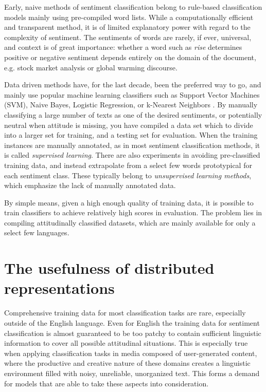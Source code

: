 Early, naive methods of sentiment classification belong to rule-based classification models mainly using pre-compiled word lists. While a computationally efficient and transparent method, it is of limited explanatory power with regard to the complexity of sentiment. The sentiments of words are rarely, if ever, universal, and context is of great importance: whether a word such as \emph{rise} determines positive or negative sentiment depends entirely on the domain of the document, e.g. stock market analysis or global warming discourse.

Data driven methods have, for the last decade, been the preferred way to go, and mainly use popular machine learning classifiers such as Support Vector Machines (SVM), Naive Bayes, Logistic Regression, or k-Nearest Neighbors \parencite{Feldman2013Techniques}. By manually classifying a large number of texts as one of the desired sentiments, or potentially neutral when attitude is missing, you have compiled a data set which to divide into a larger set for training, and a testing set for evaluation. When the training instances are manually annotated, as in most sentiment classification methods, it is called \emph{supervised learning}. There are also experiments in avoiding pre-classified training data, and instead extrapolate from a select few words prototypical for each sentiment class. These typically belong to \emph{unsupervised learning methods}, which emphasize the lack of manually annotated data.

By simple means, given a high enough quality of training data, it is possible to train classifiers to achieve relatively high scores in evaluation. The problem lies in compiling attitudinally classified datasets, which are mainly available for only a select few languages.

\section{The usefulness of distributed representations}
\label{background-non-lexical-models}

Comprehensive training data for most classification tasks are rare, especially outside of the English language. Even for English the training data for sentiment classification is almost guaranteed to be too patchy to contain sufficient linguistic information to cover all possible attitudinal situations. This is especially true when applying classification tasks in media composed of user-generated content, where the productive and creative nature of these domains creates a linguistic environment filled with noisy, unreliable, unorganized text. This forms a demand for models that are able to take these aspects into consideration.

